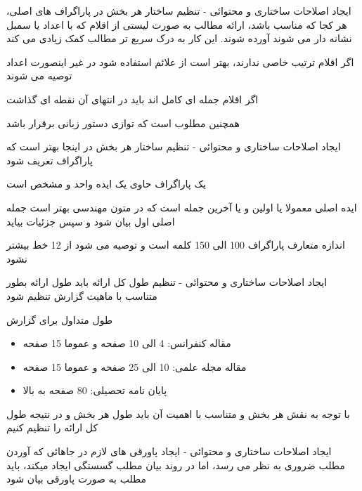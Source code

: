 \documentclass[14pt]{beamer}
\makeatletter
\newcommand{\rtlist}{\raggedleft\rightskip\@totalleftmargin}
\newcommand{\framefontsizelarge}{\fontsize{18pt}{0pt}\selectfont}
\newcommand{\frametitlefontsize}{\fontsize{20pt}{0pt}\selectfont}
\makeatother
\begin{document}
\begin{persian}
	\begin{frame}[plain]{\frametitlefontsize ایجاد اصلاحات ساختاری و محتوائی - تنظیم ساختار هر بخش}
		\framefontsizelarge
		در پاراگراف های اصلی، هر کجا که مناسب باشد، ارائه مطالب به صورت لیستی از اقلام که با اعداد یا سمبل نشانه دار می شوند آورده شوند. این کار به درک سریع تر مطالب کمک زیادی می کند
		
		اگر اقلام ترتیب خاصی ندارند، بهتر است از علائم استفاده شود در غیر اینصورت اعداد توصیه می شوند
		
		اگر اقلام جمله ای کامل اند باید در انتهای آن نقطه ای گذاشت
		
		همچنین مطلوب است که توازی دستور زبانی برقرار باشد
	\end{frame}	
	
	\begin{frame}[plain]{\frametitlefontsize ایجاد اصلاحات ساختاری و محتوائی - تنظیم ساختار هر بخش}
		\framefontsizelarge
		در اینجا بهتر است که پاراگراف تعریف شود
		
		یک پاراگراف حاوی یک ایده واحد و مشخص است
		
		ایده اصلی معمولا یا اولین و یا آخرین جمله است که در متون مهندسی بهتر است جمله اصلی اول بیان شود و سپس جزئیات بیاید
		
		اندازه متعارف پاراگراف 100 الی 150 کلمه است و توصیه می شود از 12 خط بیشتر نشود
	\end{frame}	
	
	\begin{frame}[plain]{\frametitlefontsize ایجاد اصلاحات ساختاری و محتوائی - تنظیم طول کل ارائه}
		\framefontsizelarge
		باید طول ارائه بطور متناسب با ماهیت گزارش تنظیم شود
		
		طول متداول برای گزارش 
		\begin{itemize}\rtlist
			\item مقاله کنفرانس: 4 الی 10 صفحه و عموما 15 صفحه
			\item مقاله مجله علمی: 10 الی 25 صفحه و عموما 15 صفحه
			\item پایان نامه تحصیلی: 80 صفحه به بالا
		\end{itemize}
		
		با توجه به نقش هر بخش و متناسب با اهمیت آن باید طول هر بخش و در نتیجه طول کل ارائه را تنظیم کنیم
	\end{frame}	
	
	\begin{frame}[plain]{\frametitlefontsize ایجاد اصلاحات ساختاری و محتوائی - ایجاد پاورقی های لازم}
		\framefontsizelarge
		در جاهائی که آوردن مطلب ضروری به نظر می رسد، اما در روند بیان مطلب گسستگی ایجاد میکند، باید مطلب به صورت پاورقی بیان شود
		

\end{frame}
\end{persian}
\end{document}
